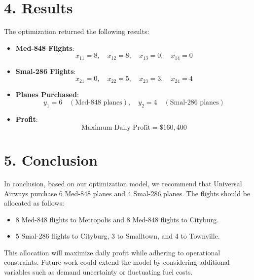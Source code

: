 \section*{4. Results}

The optimization returned the following results:
\begin{itemize}
    \item \textbf{Med-848 Flights}:
    \[
    x_{11} = 8, \quad x_{12} = 8, \quad x_{13} = 0, \quad x_{14} = 0
    \]
    \item \textbf{Smal-286 Flights}:
    \[
    x_{21} = 0, \quad x_{22} = 5, \quad x_{23} = 3, \quad x_{24} = 4
    \]
    \item \textbf{Planes Purchased}:
    \[
    y_1 = 6 \quad (\text{Med-848 planes}), \quad y_2 = 4 \quad (\text{Smal-286 planes})
    \]
    \item \textbf{Profit}:
    \[
    \text{Maximum Daily Profit} = \$160,400
    \]
\end{itemize}

\section*{5. Conclusion}

In conclusion, based on our optimization model, we recommend that Universal Airways purchase 6 Med-848 planes and 4 Smal-286 planes. The flights should be allocated as follows:
\begin{itemize}
    \item 8 Med-848 flights to Metropolis and 8 Med-848 flights to Cityburg.
    \item 5 Smal-286 flights to Cityburg, 3 to Smalltown, and 4 to Townville.
\end{itemize}
This allocation will maximize daily profit while adhering to operational constraints. Future work could extend the model by considering additional variables such as demand uncertainty or fluctuating fuel costs.
